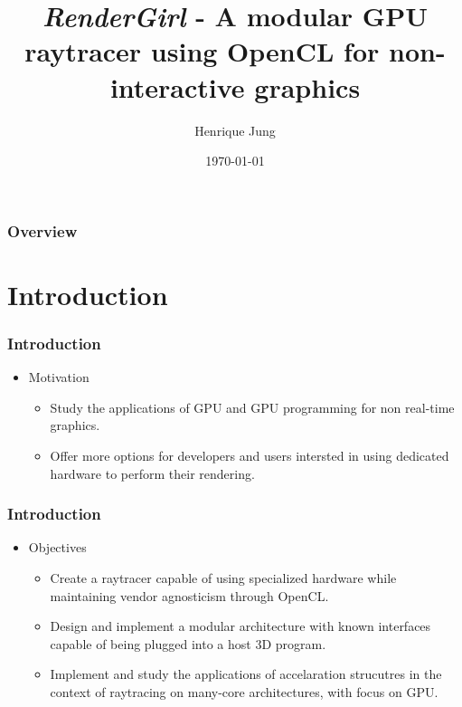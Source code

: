 \documentclass{beamer}
\title[RenderGirl]{\emph{RenderGirl} - A modular GPU raytracer using OpenCL for non-interactive graphics}
\author{Henrique Jung}
\institute[Unisinos]
{
Universidade do Vale do Rio dos Sinos \\
\medskip
\textit{henriquenj@gmail.com}
}
\date{\today}
\begin{document}

\begin{frame}
\titlepage %
\end{frame}

\begin{frame}
\frametitle{Overview}
\tableofcontents
\end{frame}

\section{Introduction}

\begin{frame}
\frametitle{Introduction}

\begin{itemize}
\item Motivation

\begin{itemize}
\item Study the applications of GPU and GPU programming for non
  real-time graphics.
\item Offer more options for developers and users intersted in using
  dedicated hardware to perform their rendering.
\end{itemize}

\end{itemize}

\frametitle{Introduction}

\begin{itemize}
\item Objectives
\begin{itemize}
\item Create a raytracer capable of using specialized hardware while
  maintaining vendor agnosticism through OpenCL.
\item Design and implement a modular architecture with known
  interfaces capable of being plugged into a host 3D program.
\item Implement and study the applications of accelaration strucutres
  in the context of raytracing on many-core architectures, with focus
  on GPU.
\end{itemize}
\end{itemize}

\end{frame}
\end{document}

